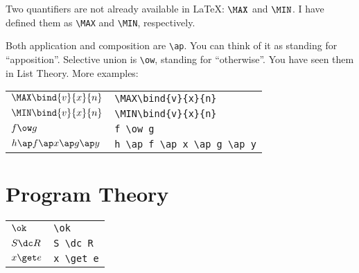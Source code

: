 \documentclass{article}
\begin{document}
Two quantifiers are not already available in \LaTeX: $\MAX$ and $\MIN$.
I have defined them as \verb$\MAX$ and \verb$\MIN$, respectively.

Both application and composition are \verb$\ap$.  You can think of it
as standing for ``apposition''.  Selective union is \verb$\ow$, standing
for ``otherwise''.  You have seen them in List Theory.  More examples:
\begin{center}
\begin{tabular}{ll}
$\MAX\bind{v}{x}{n}$ & \verb$\MAX\bind{v}{x}{n}$ \\
$\MIN\bind{v}{x}{n}$ & \verb$\MIN\bind{v}{x}{n}$ \\
$f \ow g$ & \verb$f \ow g$ \\
$h \ap f \ap x \ap g \ap y$ & \verb$h \ap f \ap x \ap g \ap y$
\end{tabular}
\end{center}


\section{Program Theory}
\begin{center}
\begin{tabular}{ll}
$\ok$ & \verb$\ok$ \\
$S \dc R$ & \verb$S \dc R$ \\
$x \get e$ & \verb$x \get e$
\end{tabular}
\end{center}
\end{document}
